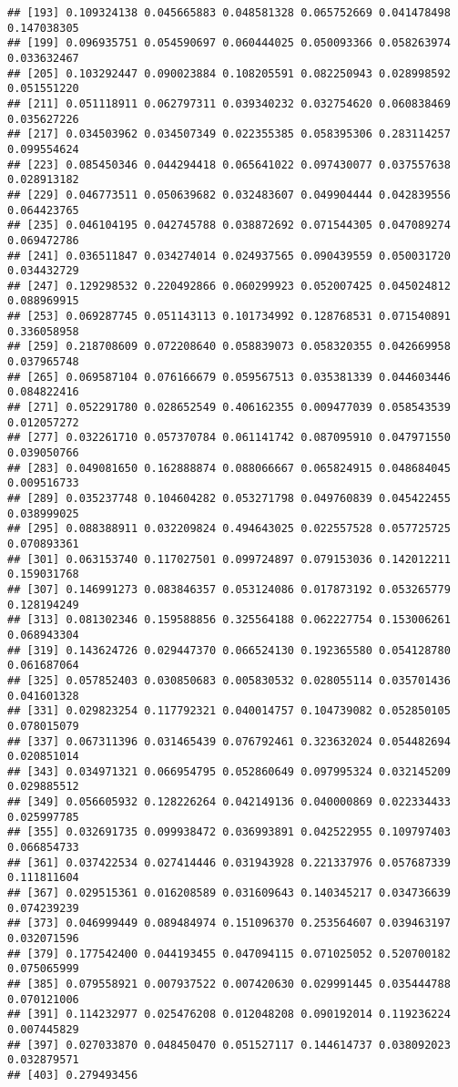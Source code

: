 \documentclass[
]{article}
\begin{document}
\begin{verbatim}
## [193] 0.109324138 0.045665883 0.048581328 0.065752669 0.041478498 0.147038305
## [199] 0.096935751 0.054590697 0.060444025 0.050093366 0.058263974 0.033632467
## [205] 0.103292447 0.090023884 0.108205591 0.082250943 0.028998592 0.051551220
## [211] 0.051118911 0.062797311 0.039340232 0.032754620 0.060838469 0.035627226
## [217] 0.034503962 0.034507349 0.022355385 0.058395306 0.283114257 0.099554624
## [223] 0.085450346 0.044294418 0.065641022 0.097430077 0.037557638 0.028913182
## [229] 0.046773511 0.050639682 0.032483607 0.049904444 0.042839556 0.064423765
## [235] 0.046104195 0.042745788 0.038872692 0.071544305 0.047089274 0.069472786
## [241] 0.036511847 0.034274014 0.024937565 0.090439559 0.050031720 0.034432729
## [247] 0.129298532 0.220492866 0.060299923 0.052007425 0.045024812 0.088969915
## [253] 0.069287745 0.051143113 0.101734992 0.128768531 0.071540891 0.336058958
## [259] 0.218708609 0.072208640 0.058839073 0.058320355 0.042669958 0.037965748
## [265] 0.069587104 0.076166679 0.059567513 0.035381339 0.044603446 0.084822416
## [271] 0.052291780 0.028652549 0.406162355 0.009477039 0.058543539 0.012057272
## [277] 0.032261710 0.057370784 0.061141742 0.087095910 0.047971550 0.039050766
## [283] 0.049081650 0.162888874 0.088066667 0.065824915 0.048684045 0.009516733
## [289] 0.035237748 0.104604282 0.053271798 0.049760839 0.045422455 0.038999025
## [295] 0.088388911 0.032209824 0.494643025 0.022557528 0.057725725 0.070893361
## [301] 0.063153740 0.117027501 0.099724897 0.079153036 0.142012211 0.159031768
## [307] 0.146991273 0.083846357 0.053124086 0.017873192 0.053265779 0.128194249
## [313] 0.081302346 0.159588856 0.325564188 0.062227754 0.153006261 0.068943304
## [319] 0.143624726 0.029447370 0.066524130 0.192365580 0.054128780 0.061687064
## [325] 0.057852403 0.030850683 0.005830532 0.028055114 0.035701436 0.041601328
## [331] 0.029823254 0.117792321 0.040014757 0.104739082 0.052850105 0.078015079
## [337] 0.067311396 0.031465439 0.076792461 0.323632024 0.054482694 0.020851014
## [343] 0.034971321 0.066954795 0.052860649 0.097995324 0.032145209 0.029885512
## [349] 0.056605932 0.128226264 0.042149136 0.040000869 0.022334433 0.025997785
## [355] 0.032691735 0.099938472 0.036993891 0.042522955 0.109797403 0.066854733
## [361] 0.037422534 0.027414446 0.031943928 0.221337976 0.057687339 0.111811604
## [367] 0.029515361 0.016208589 0.031609643 0.140345217 0.034736639 0.074239239
## [373] 0.046999449 0.089484974 0.151096370 0.253564607 0.039463197 0.032071596
## [379] 0.177542400 0.044193455 0.047094115 0.071025052 0.520700182 0.075065999
## [385] 0.079558921 0.007937522 0.007420630 0.029991445 0.035444788 0.070121006
## [391] 0.114232977 0.025476208 0.012048208 0.090192014 0.119236224 0.007445829
## [397] 0.027033870 0.048450470 0.051527117 0.144614737 0.038092023 0.032879571
## [403] 0.279493456
\end{verbatim}
\end{document}
